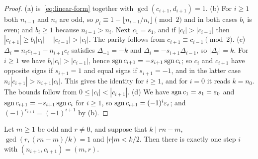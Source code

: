 \begin{proof}
(a) is~\eqref{eq:linear-form} together with $\gcd(c_{i+1},d_{i+1})=1$. (b) For $i\ge1$ both $n_{i-1}$ and $n_i$ are odd, so $\rho_i\equiv1-\lfloor n_{i-1}/n_i\rfloor\pmod2$ and in both cases $b_i$ is even; and $b_i\ge1$ because $n_{i-1}>n_i$. Next $c_1=s_1$, and if $|c_i|>|c_{i-1}|$ then $|c_{i+1}|\ge b_i|c_i|-|c_{i-1}|>|c_i|$. The parity follows from $c_{i+1}\equiv c_{i-1}\pmod2$. (c) $\Delta_i=n_ic_{i+1}-n_{i+1}c_i$ satisfies $\Delta_{-1}=-k$ and $\Delta_i=-s_{i+1}\Delta_{i-1}$, so $|\Delta_i|=k$. For $i\ge1$ we have $b_i|c_i|>|c_{i-1}|$, hence $\operatorname{sgn} c_{i+1}=-s_{i+1}\operatorname{sgn} c_i$; so $c_i$ and $c_{i+1}$ have opposite signs if $s_{i+1}=1$ and equal signs if $s_{i+1}=-1$, and in the latter case $n_i|c_{i+1}|>n_{i+1}|c_i|$. This gives the identity for $i\ge1$, and for $i=0$ it reads $k=n_0$. The bounds follow from $0\le|c_i|<|c_{i+1}|$. (d) We have $\operatorname{sgn} c_1=s_1=\varepsilon_0$ and $\operatorname{sgn} c_{i+1}=-s_{i+1}\operatorname{sgn} c_i$ for $i\ge1$, so $\operatorname{sgn} c_{i+1}=(-1)^i\varepsilon_i$; and $(-1)^{c_{i+1}}=(-1)^{i+1}$ by (b).
\end{proof}

\begin{proposition}[Converse]\label{prop:converse}
Let $m\ge1$ be odd and $r\ne0$, and suppose that $k\mid rn-m$, $\gcd(r,(rn{-}m)/k)=1$ and $|r|m<k/2$. Then there is exactly one step $i$ with $(n_{i+1},c_{i+1})=(m,r)$.
\end{proposition}

